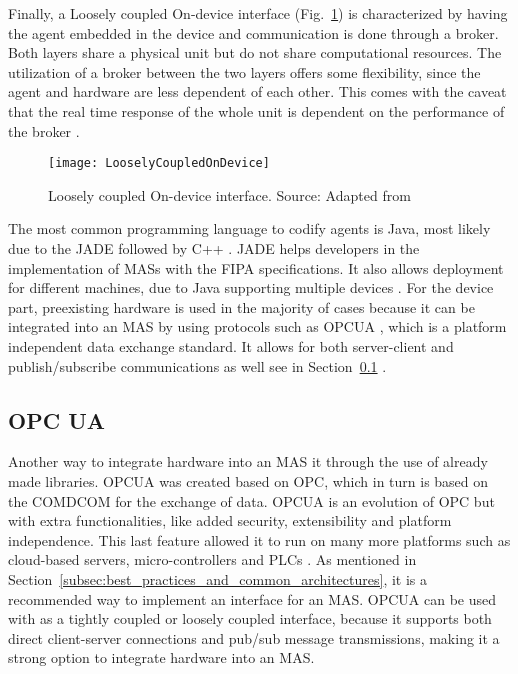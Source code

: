 Finally, a Loosely coupled On-device interface (Fig.~\ref{fig:loosely_coupled_ondevice}) is characterized by having the agent embedded in the device and communication is done through a broker. Both layers share a physical unit but do not share computational resources. The utilization of a broker between the two layers offers some flexibility, since the agent and hardware are less dependent of each other. This comes with the caveat that the real time response of the whole unit is dependent on the performance of the broker \cite{8591641}.\\

\begin{figure}[h!]
	\centering
	\texttt{[image: LooselyCoupledOnDevice]}
	\caption{Loosely coupled On-device interface. Source: Adapted from \cite{8591641}}
	\label{fig:loosely_coupled_ondevice}
\end{figure}

The most common programming language to codify agents is Java, most likely due to the \gls{JADE} followed by C++ \cite{8591641}. \gls{JADE} helps developers in the implementation of \gls{MAS}s with the \gls{FIPA} specifications. It also allows deployment for different machines, due to Java supporting multiple devices \cite{JADE_website}.
For the device part, preexisting hardware is used in the majority of cases because it can be integrated into an \gls{MAS} by using protocols such as \gls{OPCUA} \cite{8591641}, which is a platform independent data exchange standard. It allows for both server-client and publish/subscribe communications as well see in Section~\ref{subsec:opcua} \cite{OPCUA_website}.

\subsection{OPC UA}
\label{subsec:opcua}



Another way to integrate hardware into an \gls{MAS} it through the use of already made libraries. \gls{OPCUA} was created based on \gls{OPC}, which in turn is based on the \gls{COMDCOM} for the exchange of data. \gls{OPCUA} is an evolution of \gls{OPC} but with extra functionalities, like added security, extensibility and platform independence. This last feature allowed it to run on many more platforms such as cloud-based servers, micro-controllers and \gls{PLC}s \cite{OPCUA_website}. As mentioned in Section~\ref{subsec:best_practices_and_common_architectures}, it is a recommended way to implement an interface for an \gls{MAS}. \gls{OPCUA} can be used with as a tightly coupled or loosely coupled interface, because it supports both direct client-server connections and pub/sub message transmissions, making it a strong option to integrate hardware into an \gls{MAS}.\\

